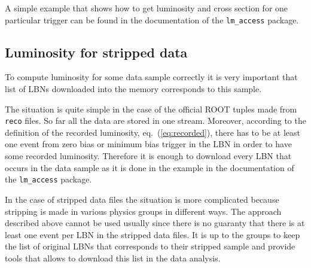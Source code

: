 \documentclass[12pt]{article}
\begin{document}
A simple example that shows how to get luminosity and cross section for one
particular trigger can be found in the documentation of the {\tt lm\_access}
package.

\subsection{Luminosity for stripped data}

To compute luminosity for some data sample correctly it is
very important that list of LBNs downloaded into the memory corresponds
to this sample.

The situation is quite simple in the case of the official ROOT tuples
made from {\tt reco} files. So far all the data are stored in one stream.
Moreover, according to the definition of the recorded luminosity, 
eq.~(\ref{eq:recorded}), there has to be at least one event from zero bias
or minimum bias trigger in the LBN in order to have some recorded luminosity.
Therefore it is enough to download every LBN that occurs in the data sample
as it is done in the example in the documentation of the {\tt lm\_access}
package.

In the case of stripped data files the situation is more complicated 
because stripping is made in various physics groups in different ways.
The approach described above cannot be used usually since there is no guaranty 
that there is at least one event per LBN in the stripped data files.
It is up to the groups to keep the list of original LBNs that corresponds to
their stripped sample and provide tools that allows to download this list
in the data analysis.

\newpage
% 
%

 
\end{document}

